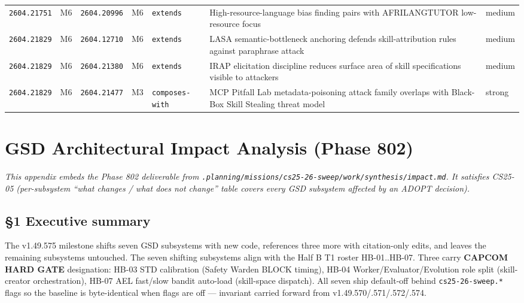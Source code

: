 \documentclass[11pt,letterpaper]{article}
\newcommand{\arxivid}[1]{\texttt{\textcolor{accent}{#1}}}
\begin{document}
\begin{footnotesize}
\begin{longtable}{@{}L{0.09\textwidth} L{0.03\textwidth} L{0.09\textwidth} L{0.03\textwidth} L{0.13\textwidth} L{0.40\textwidth} L{0.06\textwidth}@{}}
\arxivid{2604.21751} & M6 & \arxivid{2604.20996} & M6 & \texttt{\small extends} & High-resource-language bias finding pairs with AFRILANGTUTOR low-resource focus & medium \\
\arxivid{2604.21829} & M6 & \arxivid{2604.12710} & M6 & \texttt{\small extends} & LASA semantic-bottleneck anchoring defends skill-attribution rules against paraphrase attack & medium \\
\arxivid{2604.21829} & M6 & \arxivid{2604.21380} & M6 & \texttt{\small extends} & IRAP elicitation discipline reduces surface area of skill specifications visible to attackers & medium \\
\arxivid{2604.21829} & M6 & \arxivid{2604.21477} & M3 & \texttt{\small composes-with} & MCP Pitfall Lab metadata-poisoning attack family overlaps with Black-Box Skill Stealing threat model & strong \\
\end{longtable}
\end{footnotesize}


\clearpage

\section{GSD Architectural Impact Analysis (Phase 802)}

\textit{This appendix embeds the Phase 802 deliverable from \texttt{.planning/missions/cs25-26-sweep/work/synthesis/impact.md}. It satisfies CS25-05 (per-subsystem ``what changes / what does not change'' table covers every GSD subsystem affected by an ADOPT decision).}

\subsection{§1 Executive summary}

The v1.49.575 milestone shifts seven GSD subsystems with new code,
references three more with citation-only edits, and leaves the remaining
subsystems untouched. The seven shifting subsystems align with the Half
B T1 roster HB-01..HB-07. Three carry \textbf{CAPCOM HARD GATE}
designation: HB-03 STD calibration (Safety Warden BLOCK timing), HB-04
Worker/Evaluator/Evolution role split (skill-creator orchestration),
HB-07 AEL fast/slow bandit auto-load (skill-space dispatch). All seven
ship default-off behind \texttt{cs25-26-sweep.*} flags so the baseline
is byte-identical when flags are off --- invariant carried forward from
v1.49.570/.571/.572/.574.
\end{document}

